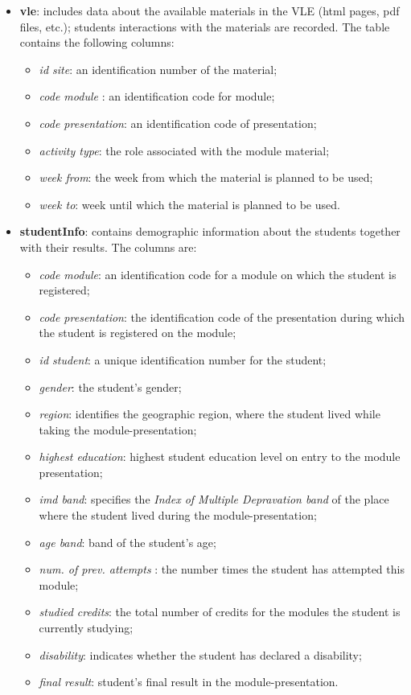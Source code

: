 \documentclass{article}
\begin{document}
\begin{itemize}
    
    \item \textbf{vle}: includes data about the available materials in the VLE (html pages, pdf files, etc.); students interactions with the materials are recorded. The table contains the following columns:
    \begin{itemize}
        \item \textit{id site}: an identification number of the material;
        \item \textit{code module }: an identification code for module;
        \item \textit{code presentation}: an identification code of presentation;
        \item \textit{activity type}: the role associated with the module material;
        \item \textit{week from}: the week from which the material is planned to be used;
        \item \textit{week to}: week until which the material is planned to be used.
    \end{itemize}

    \item \textbf{studentInfo}: contains demographic information about the students together with their results. The columns are:
    \begin{itemize}
        \item \textit{code module}: an identification code for a module on which the student is registered;
        \item \textit{code presentation}: the identification code of the presentation during which the student is registered on the module;
        \item \textit{id student}: a unique identification number for the student;
        \item \textit{gender}: the student’s gender;
        \item \textit{region}: identifies the geographic region, where the student lived while taking the module-presentation;
        \item \textit{highest education}: highest student education level on entry to the module presentation;
        \item \textit{imd band}: specifies the \textit{Index of Multiple Depravation band} of the place where the student lived during the module-presentation;
        \item \textit{age band}: band of the student’s age;
        \item \textit{num. of prev. attempts }: the number times the student has attempted this module;
        \item \textit{studied credits}: the total number of credits for the modules the student is currently studying;
        \item \textit{disability}: indicates whether the student has declared a disability;
        \item \textit{final result}: student’s final result in the module-presentation.
    \end{itemize}


\end{itemize}
\end{document}
